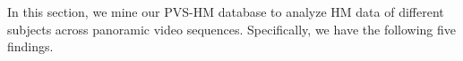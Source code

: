 \documentclass[10pt,journal,compsoc]{IEEEtran}
\makeatletter
\newcommand{\tabincell}[2]{\begin{tabular}{@{}#1@{}}#2\end{tabular}}
\makeatother
\begin{document}
In this section, we mine our PVS-HM database to analyze HM data of different subjects across panoramic video sequences.
Specifically, we have the following five findings.

\end{document}
